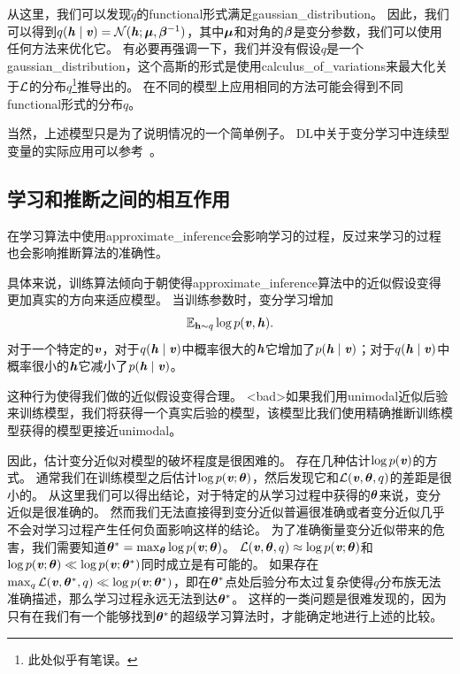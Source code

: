 从这里，我们可以发现$\tilde{q}$的\gls{functional}形式满足\gls{gaussian_distribution}。
因此，我们可以得到$q(\boldsymbol{\mathit{h}}\mid\boldsymbol{\mathit{v}}) = \mathcal{N}(\boldsymbol{\mathit{h}};\boldsymbol{\mu},\boldsymbol{\beta}^{-1})$，其中$\boldsymbol{\mu}$和对角的$\boldsymbol{\beta}$是变分参数，我们可以使用任何方法来优化它。
有必要再强调一下，我们并没有假设$q$是一个\gls{gaussian_distribution}，这个高斯的形式是使用\gls{calculus_of_variations}来最大化关于$\mathcal{L}$的分布$q$\footnote{此处似乎有笔误。}推导出的。    %
在不同的模型上应用相同的方法可能会得到不同\gls{functional}形式的分布$q$。

当然，上述模型只是为了说明情况的一个简单例子。
\gls{DL}中关于变分学习中连续型变量的实际应用可以参考~\citet{Goodfeli-et-al-TPAMI-Deep-PrePrint-2013-small}。



\subsection{学习和推断之间的相互作用}
\label{sec:interactions_between_learning_and_inference}


在学习算法中使用\gls{approximate_inference}会影响学习的过程，反过来学习的过程也会影响推断算法的准确性。


具体来说，训练算法倾向于朝使得\gls{approximate_inference}算法中的近似假设变得更加真实的方向来适应模型。
当训练参数时，变分学习增加
\begin{align}
\label{eqn:1968}
	\mathbb{E}_{\mathbf{h} \sim q}\log p(\boldsymbol{\mathit{v}},\boldsymbol{\mathit{h}}).
\end{align}
对于一个特定的$\boldsymbol{\mathit{v}}$，对于$q(\boldsymbol{\mathit{h}} \mid \boldsymbol{\mathit{v}})$中概率很大的$\boldsymbol{\mathit{h}}$它增加了$p(\boldsymbol{\mathit{h}}\mid\boldsymbol{\mathit{v}})$；对于$q(\boldsymbol{\mathit{h}} \mid \boldsymbol{\mathit{v}})$中概率很小的$\boldsymbol{\mathit{h}}$它减小了$p(\boldsymbol{\mathit{h}}\mid\boldsymbol{\mathit{v}})$。

这种行为使得我们做的近似假设变得合理。 %
<bad>如果我们用\gls{unimodal}近似后验来训练模型，我们将获得一个真实后验的模型，该模型比我们使用精确推断训练模型获得的模型更接近\gls{unimodal}。

	
因此，估计变分近似对模型的破坏程度是很困难的。
存在几种估计$\log p(\boldsymbol{\mathit{v}})$的方式。
通常我们在训练模型之后估计$\log p(\boldsymbol{\mathit{v}};\boldsymbol{\theta})$，然后发现它和$\mathcal{L}(\boldsymbol{\mathit{v}},\boldsymbol{\theta},q)$的差距是很小的。
从这里我们可以得出结论，对于特定的从学习过程中获得的$\boldsymbol{\theta}$来说，变分近似是很准确的。
然而我们无法直接得到变分近似普遍很准确或者变分近似几乎不会对学习过程产生任何负面影响这样的结论。
为了准确衡量变分近似带来的危害，我们需要知道$\boldsymbol{\theta}^* = \max_{\boldsymbol{\theta}} \log p(\boldsymbol{\mathit{v}};\boldsymbol{\theta})$。
$\mathcal{L}(\boldsymbol{\mathit{v}},\boldsymbol{\theta},q)\approx \log p(\boldsymbol{\mathit{v}};\boldsymbol{\theta})$和$\log p(\boldsymbol{\mathit{v}};\boldsymbol{\theta})\ll \log p(\boldsymbol{\mathit{v}};\boldsymbol{\theta}^*)$同时成立是有可能的。
如果存在$\max_q \mathcal{L}(\boldsymbol{\mathit{v}},\boldsymbol{\theta}^*,q)\ll \log p(\boldsymbol{\mathit{v}};\boldsymbol{\theta}^*)$，即在$\boldsymbol{\theta}^*$点处后验分布太过复杂使得$q$分布族无法准确描述，那么学习过程永远无法到达$\boldsymbol{\theta}^*$。
这样的一类问题是很难发现的，因为只有在我们有一个能够找到$\boldsymbol{\theta}^*$的超级学习算法时，才能确定地进行上述的比较。



